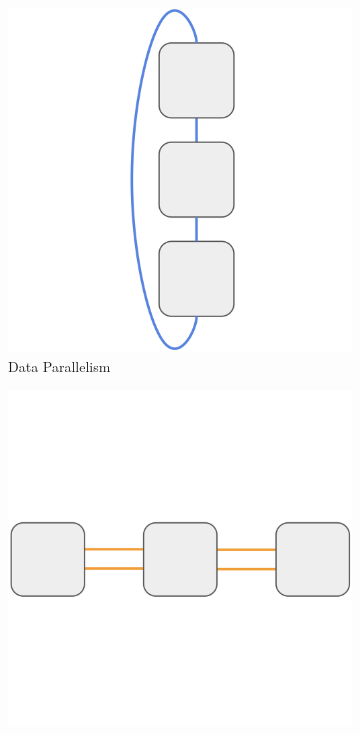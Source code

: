 \documentclass{article}
\begin{document}
\begin{figure}[ht]
    \centering
    \begin{subfigure}[b]{0.22\textwidth}
        \centering
        \includegraphics[width=\textwidth]{figures/dp.png}
        \caption{Data Parallelism}
    \end{subfigure}
    \hfill
    \begin{subfigure}[b]{0.22\textwidth}
        \centering
        \includegraphics[width=\textwidth]{figures/pp.png}

\end{subfigure}
\end{figure}
\end{document}
